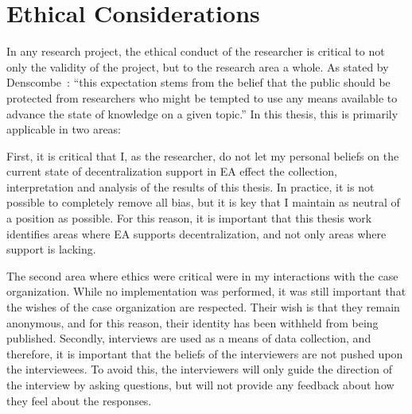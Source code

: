 \label{sec:ethics}
\section{Ethical Considerations}

In any research project, the ethical conduct of the researcher is critical to not only the validity of the project, but to the research area a whole. As stated by Denscombe~\cite{denscombe2010good}: ``this expectation stems from the belief that the public should be protected from researchers who might be tempted to use any means available to advance the state of knowledge on a given topic.'' In this thesis, this is primarily applicable in two areas:

First, it is critical that I, as the researcher, do not let my personal beliefs on the current state of decentralization support in EA effect the collection, interpretation and analysis of the results of this thesis. In practice, it is not possible to completely remove all bias, but it is key that I maintain as neutral of a position as possible. For this reason, it is important that this thesis work identifies areas where EA supports decentralization, and not only areas where support is lacking. 

The second area where ethics were critical were in my interactions with the case organization. While no implementation was performed, it was still important that the wishes of the case organization are respected. Their wish is that they remain anonymous, and for this reason, their identity has been withheld from being published. Secondly, interviews are used as a means of data collection, and therefore, it is important that the beliefs of the interviewers are not pushed upon the interviewees. To avoid this, the interviewers will only guide the direction of the interview by asking questions, but will not provide any feedback about how they feel about the responses. 
